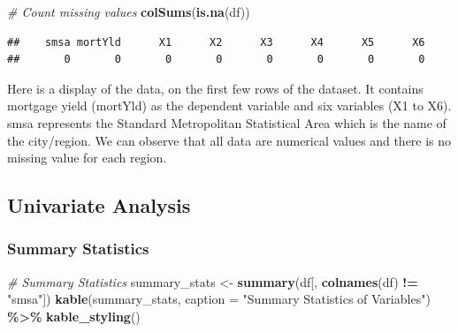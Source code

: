 \documentclass[
  12pt,
]{article}
\newenvironment{Shaded}{\begin{snugshade}}{\end{snugshade}}
\newcommand{\AttributeTok}[1]{\textcolor[rgb]{0.13,0.29,0.53}{#1}}
\newcommand{\CommentTok}[1]{\textcolor[rgb]{0.56,0.35,0.01}{\textit{#1}}}
\newcommand{\FunctionTok}[1]{\textcolor[rgb]{0.13,0.29,0.53}{\textbf{#1}}}
\newcommand{\NormalTok}[1]{#1}
\newcommand{\OtherTok}[1]{\textcolor[rgb]{0.56,0.35,0.01}{#1}}
\newcommand{\SpecialCharTok}[1]{\textcolor[rgb]{0.81,0.36,0.00}{\textbf{#1}}}
\newcommand{\StringTok}[1]{\textcolor[rgb]{0.31,0.60,0.02}{#1}}
\begin{document}
\begin{Shaded}
\begin{Highlighting}[]
\CommentTok{\# Count missing values}
\FunctionTok{colSums}\NormalTok{(}\FunctionTok{is.na}\NormalTok{(df))}
\end{Highlighting}
\end{Shaded}

\begin{verbatim}
##    smsa mortYld      X1      X2      X3      X4      X5      X6 
##       0       0       0       0       0       0       0       0
\end{verbatim}

Here is a display of the data, on the first few rows of the dataset. It
contains mortgage yield (mortYld) as the dependent variable and six
variables (X1 to X6). smsa represents the Standard Metropolitan
Statistical Area which is the name of the city/region. We can observe
that all data are numerical values and there is no missing value for
each region.

\subsection{Univariate Analysis}\label{univariate-analysis}

\subsubsection{Summary Statistics}\label{summary-statistics}

\begin{Shaded}
\begin{Highlighting}[]
\CommentTok{\# Summary Statistics}
\NormalTok{summary\_stats }\OtherTok{\textless{}{-}} \FunctionTok{summary}\NormalTok{(df[, }\FunctionTok{colnames}\NormalTok{(df) }\SpecialCharTok{!=} \StringTok{"smsa"}\NormalTok{])}
\FunctionTok{kable}\NormalTok{(summary\_stats, }\AttributeTok{caption =} \StringTok{"Summary Statistics of Variables"}\NormalTok{) }\SpecialCharTok{\%\textgreater{}\%} \FunctionTok{kable\_styling}\NormalTok{()}
\end{Highlighting}
\end{Shaded}
\end{document}
